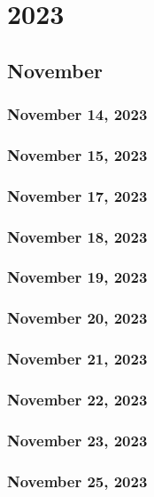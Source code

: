 \part{2023}
\chapter{November}
\section{November 14, 2023}


\section{November 15, 2023}


\section{November 17, 2023}


\section{November 18, 2023}


\section{November 19, 2023}


\section{November 20, 2023}


\section{November 21, 2023}



\section{November 22, 2023}



\section{November 23, 2023}

\section{November 25, 2023}



